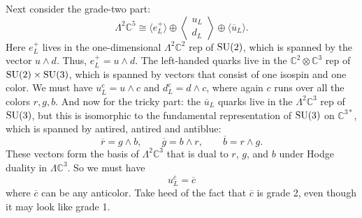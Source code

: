\documentclass{article}
\newcommand{\C}{{\mathbb C}}  %
\newcommand{\SU}{{\rm SU}}    %
\newcommand{\Ex}{\Lambda} %
\newcommand{\iso}{\cong} %
\newcommand{\ubar}{\overline{u}} %
\newcommand{\rbar}{{\overline{r}}} %
\newcommand{\gbar}{{\overline{g}}} %
\newcommand{\bbar}{{\overline{b}}} %
\newcommand{\cbar}{{\overline{c}}} %
\newcommand{\angquark}{\left\langle \! \begin{array}{c} u_L \\ d_L \end{array} \! \right\rangle} %
\begin{document}
Next consider the grade-two part:
\[        \Ex^2 \C^5  \iso  \langle e^+_L \rangle \oplus \angquark \oplus 
\langle \ubar_L \rangle .\]
Here $e^+_L$ lives in the one-dimensional $\Ex^2 \C^2$ rep
of $\SU(2)$, which is spanned by the vector $u \wedge d$. 
Thus, $e^+_L = u \wedge d$.  The left-handed quarks 
live in the $\C^2 \otimes \C^3$ rep of $\SU(2) \times \SU(3)$,
which is spanned by vectors that consist of one isospin and one color. We must
have $u^c_L = u \wedge c$ and $d^c_L = d \wedge c$, where again $c$ runs 
over all the colors $r,g,b$.  And now for the tricky part: the $\ubar_L$ 
quarks live in the $\Ex^2 \C^3$ rep of $\SU(3)$, but this is isomorphic 
to the fundamental representation of $\SU(3)$ on $\C^{3*}$, which is
spanned by antired, antired and antiblue:
\[ \rbar = g \wedge b , \qquad
   \gbar = b \wedge r , \qquad
   \bbar = r \wedge g. \]
These vectors form the basis of $\Ex^2 \C^3$ that is dual to $r$, $g$, 
and $b$ under Hodge duality in $\Ex \C^3$.  So we must have
\[ u^\cbar_L = \cbar \]
where $\cbar$ can be any anticolor.  Take heed of the fact that $\cbar$ 
is grade 2, even though it may look like grade 1.
\end{document}
